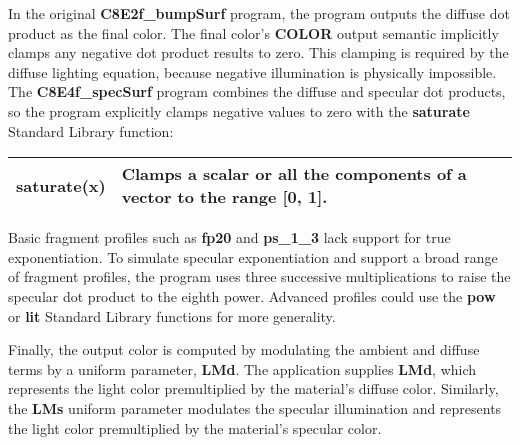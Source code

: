 \documentclass[../main.tex]{subfiles}
\begin{document}
In the original \textbf{C8E2f_bumpSurf} program, the program outputs the diffuse dot product as the final color. The final color's \textbf{COLOR} output semantic implicitly clamps any negative dot product results to zero. This clamping is required by the diffuse lighting equation, because negative illumination is physically impossible. The \textbf{C8E4f_specSurf} program combines the diffuse and specular dot products, so the program explicitly clamps negative values to zero with the \textbf{saturate} Standard Library function:

\FloatBarrier
\begin{table}
\centering
\begin{tabular}{ p{5cm} p{7cm}  } 
\hline
\textbf{saturate(x)} & Clamps a scalar or all the components of a vector to the range [0, 1]. \\
\hline
\end{tabular}
\end{table}
\FloatBarrier

Basic fragment profiles such as \textbf{fp20} and \textbf{ps_1_3} lack support for true exponentiation. To simulate specular exponentiation and support a broad range of fragment profiles, the program uses three successive multiplications to raise the specular dot product to the eighth power. Advanced profiles could use the \textbf{pow} or \textbf{lit} Standard Library functions for more generality.

Finally, the output color is computed by modulating the ambient and diffuse terms by a uniform parameter, \textbf{LMd}. The application supplies \textbf{LMd}, which represents the light color premultiplied by the material's diffuse color. Similarly, the \textbf{LMs} uniform parameter modulates the specular illumination and represents the light color premultiplied by the material's specular color.
\end{document}
